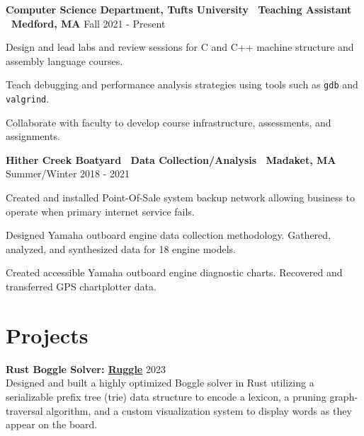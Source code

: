 \documentclass[letter,10pt]{article}
\newenvironment{mylist}[1][]
    {\itemize[nosep, wide=0pt, leftmargin=*, after=\strut]}
    {\enditemize}
\begin{document}
\begin{minipage}[t]{\linewidth}
    \textbf{Computer Science Department, Tufts University \textbar \ Teaching Assistant \textbar \ Medford, MA} \hfill Fall 2021 - Present
    \begin{mylist} 
        \item Design and lead labs and review sessions for C and C++ machine structure and assembly language courses. 
        \item Teach debugging and performance analysis strategies using tools such as \texttt{gdb} and \texttt{valgrind}.
        \item Collaborate with faculty to develop course infrastructure, assessments, and assignments.
    \end{mylist}
\end{minipage}

\begin{minipage}[t]{\linewidth}
    \textbf{Hither Creek Boatyard \textbar \ Data Collection/Analysis \textbar \ Madaket, MA} \hfill Summer/Winter 2018 - 2021
    \begin{mylist}
        \item Created and installed Point-Of-Sale system backup network allowing business to operate when primary internet service fails.
        \item Designed Yamaha outboard engine data collection methodology. Gathered, analyzed, and synthesized data for 18 engine models.
        \item Created accessible Yamaha outboard engine diagnostic charts. Recovered and transferred GPS chartplotter data. 
    \end{mylist}
\end{minipage}


\section{Projects}

\begin{minipage}[t]{\linewidth}
    \textbf{Rust Boggle Solver: \href{https://github.com/liam-strand/ruggle}{Ruggle}} \hfill 2023 \\
    Designed and built a highly optimized Boggle solver in Rust utilizing a serializable prefix tree (trie) data structure to encode a lexicon, a pruning graph-traversal algorithm, and a custom visualization system to display words as they appear on the board.
\end{minipage}
\end{document}

